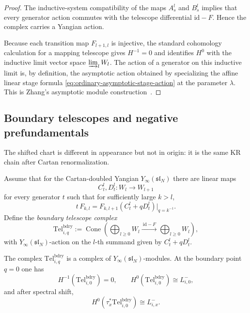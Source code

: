 \begin{proof}
The inductive-system compatibility of the maps $A_s^l$ and $B_s^l$ implies
that every generator action commutes with the telescope differential
$\mathrm{id}-F$. Hence the complex carries a Yangian action.

Because each transition map $F_{l+1,l}$ is injective, the standard
cohomology calculation for a mapping telescope gives
$H^{-1}=0$ and identifies $H^0$ with the inductive limit vector space
$\varinjlim_l W_l$. The action of a generator on this inductive limit is,
by definition, the asymptotic action obtained by specializing the affine
linear stage formula \eqref{eq:ordinary-asymptotic-stage-action} at the
parameter $\lambda$. This is Zhang's asymptotic module
construction~\cite{Zhang24}.
\end{proof}

\subsection{Boundary telescopes and negative prefundamentals}

The shifted chart is different in appearance but not in origin: it is the
same KR chain after Cartan renormalization.

\begin{definition}
\label{def:boundary-telescope}
Assume that for the Cartan-doubled Yangian $Y_\infty(\mathfrak{sl}_N)$
there are linear maps
\begin{equation}
C_t^l,D_t^l:W_l\longrightarrow W_{l+1}
\end{equation}
for every generator $t$ such that for sufficiently large $k>l$,
\begin{equation}
\label{eq:boundary-stage-action}
t\,F_{k,l}=F_{k,l+1}(C_t^l+qD_t^l)\big|_{q=k^{-1}}.
\end{equation}
Define the \emph{boundary telescope complex}
\begin{equation}
\mathrm{Tel}^{\mathrm{bdry}}_{i,q}
:=
\operatorname{Cone}\!\left(
\bigoplus_{l\ge 0}W_l
\xrightarrow{\ \mathrm{id}-F\ }
\bigoplus_{l\ge 0}W_l
\right),
\end{equation}
with $Y_\infty(\mathfrak{sl}_N)$-action on the $l$-th summand given by
$C_t^l+qD_t^l$.
\end{definition}

\begin{theorem}
\ClaimStatusProvedHere
\label{thm:derived-realization-negative-prefundamental}
The complex $\mathrm{Tel}^{\mathrm{bdry}}_{i,q}$ is a complex of
$Y_\infty(\mathfrak{sl}_N)$-modules. At the boundary point $q=0$ one has
\begin{equation}
H^{-1}(\mathrm{Tel}^{\mathrm{bdry}}_{i,0})=0,
\qquad
H^0(\mathrm{Tel}^{\mathrm{bdry}}_{i,0})\cong L^-_{i,0},
\end{equation}
and after spectral shift,
\begin{equation}
H^0(\tau_x^*\mathrm{Tel}^{\mathrm{bdry}}_{i,0})\cong L^-_{i,x}.
\end{equation}
\end{theorem}

